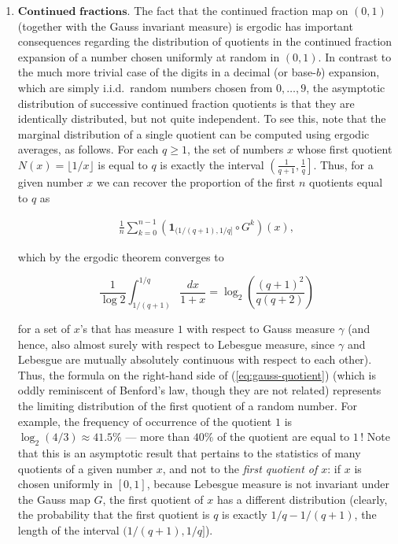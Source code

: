 \documentclass[11pt]{report}
\theoremstyle{plain}
\theoremstyle{definition}
\newtheorem{xexercise}[thm]{Exercise}
\begin{document}
\begin{enumerate}[label=\arabic*.]
\begin{xexercise}
Let $n<m$ be positive integers. Prove that if $m$ is not an integer power of $n$ then $\log_m n$ is an irrational number.
\end{xexercise}
\item $\textbf{Continued fractions.}$ The fact that the continued fraction map on $(0,1)$ (together with the Gauss invariant measure) is ergodic has important consequences regarding the distribution of quotients in the continued fraction expansion of a number chosen uniformly at random in $(0,1)$. In contrast to the much more trivial case of the digits in a decimal (or base-$b$) expansion, which are simply i.i.d.\ random numbers chosen from $0,\ldots,9$, the asymptotic distribution of successive continued fraction quotients is that they are identically distributed, but not quite independent. To see this, note that the marginal distribution of a single quotient can be computed using ergodic averages, as follows. For each $q\ge 1$, the set of numbers $x$ whose first quotient $N(x)=\lfloor 1/x \rfloor$ is equal to $q$ is exactly the interval $\left(\frac{1}{q+1},\frac{1}{q}\right]$. Thus, for a given number $x$ we can recover the proportion of the first $n$ quotients equal to $q$ as

\begin{align*}
\frac{1}{n} \sum_{k=0}^{n-1} \left(\mathbf{1}_{(1/(q+1),1/q]}\circ G^k\right)(x),
\end{align*}

which by the ergodic theorem converges to

\begin{equation*} \tag{21}\label{eq:gauss-quotient}
\frac{1}{\log 2}\int_{1/(q+1)}^{1/q} \frac{dx}{1+x} = \log_2 \left( \frac{(q+1)^2}{q(q+2)}\right)
\end{equation*}

for a set of $x$'s that has measure $1$ with respect to Gauss measure $\gamma$ (and hence, also almost surely with respect to Lebesgue measure, since $\gamma$ and Lebesgue are mutually absolutely continuous with respect to each other). Thus, the formula on the right-hand side of (\ref{eq:gauss-quotient}) (which is oddly reminiscent of Benford's law, though they are not related) represents the limiting distribution of the first quotient of a random number. For example, the frequency of occurrence of the quotient $1$ is $\log_2(4/3) \approx 41.5\%$ --- more than $40\%$ of the quotient are equal to $1$\,! Note that this is an asymptotic result that pertains to the statistics of many quotients of a given number $x$, and not to the \emph{first quotient of $x$}: if $x$ is chosen uniformly in $[0,1]$, because Lebesgue measure is not invariant under the Gauss map $G$, the first quotient of $x$ has a different distribution (clearly, the probability that the first quotient is $q$ is exactly $1/q-1/(q+1)$, the length of the interval $(1/(q+1),1/q]$).


\end{enumerate}
\end{document}
